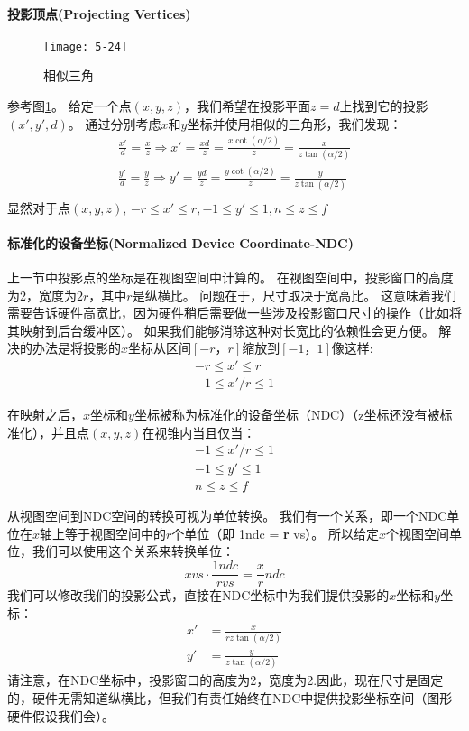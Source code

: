 \paragraph{投影顶点(Projecting Vertices)}
\begin{figure}[t]
    \texttt{[image: 5-24]}
    \centering
    \caption{相似三角}
    \label{fig:5-24}
\end{figure}
\begin{flushleft}
参考图\ref{fig:5-24}。 给定一个点$(x,y,z)$，我们希望在投影平面$z = d$上找到它的投影$(x',y',d)$。 通过分别考虑$x$和$y$坐标并使用相似的三角形，我们发现：
\begin{align*}
\frac{x'}{d}=\frac{x}{z}\Rightarrow x'=\frac{xd}{z}=\frac{x\cot(\alpha/2)}{z}=\frac{x}{z\tan(\alpha/2)}\\
\frac{y'}{d}=\frac{y}{z}\Rightarrow y'=\frac{yd}{z}=\frac{y\cot(\alpha/2)}{z}=\frac{y}{z\tan(\alpha/2)}\\
\end{align*}
显然对于点$(x,y,z)$, $-r\leq x'\leq r,-1\leq y'\leq 1,n\leq z\leq f$
\end{flushleft}

\paragraph{标准化的设备坐标(Normalized Device Coordinate-NDC)}
\begin{flushleft}
上一节中投影点的坐标是在视图空间中计算的。 在视图空间中，投影窗口的高度为2，宽度为$2r$，其中$r$是纵横比。 问题在于，尺寸取决于宽高比。 这意味着我们需要告诉硬件高宽比，因为硬件稍后需要做一些涉及投影窗口尺寸的操作（比如将其映射到后台缓冲区）。 如果我们能够消除这种对长宽比的依赖性会更方便。 解决的办法是将投影的$x$坐标从区间$[-r，r]$缩放到$[-1，1]$像这样:
\begin{align*}
-r\leq x' \leq r \\
-1\leq x'/r \leq 1
\end{align*}

在映射之后，$x$坐标和$y$坐标被称为标准化的设备坐标（NDC）（z坐标还没有被标准化），并且点$(x,y,z)$在视锥内当且仅当：
\begin{align*}
-1\leq x'/r \leq 1 \\
-1\leq y' \leq 1 \\
n \leq z \leq f
\end{align*}

从视图空间到NDC空间的转换可视为单位转换。 我们有一个关系，即一个NDC单位在$x$轴上等于视图空间中的$r$个单位（即 1ndc = \textbf{r} vs）。 所以给定$x$个视图空间单位，我们可以使用这个关系来转换单位：
$$x\mathit{vs}\cdot \frac{1\mathit{ndc}}{r\mathit{vs}}=\frac{x}{r}\mathit{ndc}$$
我们可以修改我们的投影公式，直接在NDC坐标中为我们提供投影的$x$坐标和$y$坐标：
\begin{align*}\tag{eq.5.1}\label{eq.5.1}
x'&=\frac{x}{rz\tan(\alpha/2)}\\
y'&=\frac{y}{z\tan(\alpha/2)}
\end{align*}
请注意，在NDC坐标中，投影窗口的高度为2，宽度为2.因此，现在尺寸是固定的，硬件无需知道纵横比，但我们有责任始终在NDC中提供投影坐标空间（图形硬件假设我们会）。
\end{flushleft}


